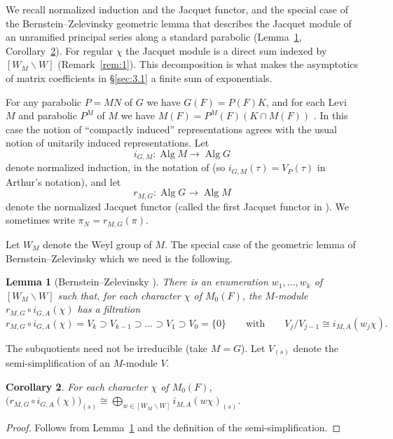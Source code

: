 \documentclass[12pt,letterpaper]{article}
\numberwithin{equation}{section}
\theoremstyle{plain}
\newtheorem{lemma}{Lemma}[section]
\newtheorem{corollary}[lemma]{Corollary}
\theoremstyle{remark}
\theoremstyle{plain}
\theoremstyle{definition}
\theoremstyle{remark}
\theoremstyle{remark}
\DeclareMathOperator{\Alg}{Alg}
\newcommand{\Wrep}[1]{[W_{#1}\backslash W]}
\begin{document}
We recall normalized induction and the Jacquet functor, and the special case of the Bernstein--Zelevinsky geometric lemma that describes the Jacquet module of an unramified principal series along a standard parabolic (Lemma~\ref{lem:2.4}, Corollary~\ref{cor:2.5}). For regular $\chi$ the Jacquet module is a direct sum indexed by $\Wrep{M}$ (Remark~\ref{rem:1}). This decomposition is what makes the asymptotics of matrix coefficients in \S\ref{sec:3.1} a finite sum of exponentials.


For any parabolic $P=MN$ of $G$ we have $G(F)=P(F)K$, and for each Levi $M$ and parabolic $P^M$ of $M$ we have $M(F)=P^M(F)(K\cap M(F))$ \cite[p.~140]{Ca79}. In this case the notion of ``compactly induced'' representations \cite[\S1.8]{BZ77} agrees with the usual notion of unitarily induced representations. Let
\begin{equation}\label{eq:2.14}
i_{G,M}:\Alg M\to\Alg G
\end{equation}
denote normalized induction, in the notation of \cite{BZ77} (so $i_{G,M}(\tau)=V_P(\tau)$ in Arthur's notation), and let
\begin{equation}\label{eq:2.15}
r_{M,G}:\Alg G\to\Alg M
\end{equation}
denote the normalized Jacquet functor \cite[\S2.3]{BZ77} (called the first Jacquet functor in \cite[\S2.2]{Ca79}). We sometimes write $\pi_N=r_{M,G}(\pi)$.

Let $W_M$ denote the Weyl group of $M$. The special case of the geometric lemma of Bernstein--Zelevinsky which we need is the following.

\begin{lemma}[Bernstein--Zelevinsky {\cite[\S2.12]{BZ77}}]\label{lem:2.4}
There is an enumeration $w_1,\dots,w_k$ of $\Wrep{M}$ such that, for each character $\chi$ of $M_0(F)$, the $M$-module $r_{M,G}\circ i_{G,A}(\chi)$ has a filtration
\[
r_{M,G}\circ i_{G,A}(\chi)=V_k\supset V_{k-1}\supset\dots\supset V_1\supset V_0=\{0\}
\qquad\text{with}\qquad V_{j}/V_{j-1}\cong i_{M,A}(w_j\chi).
\]
\end{lemma}
The subquotients need not be irreducible (take $M=G$). Let $V_{(s)}$ denote the semi-simplification of an $M$-module $V$.

\begin{corollary}\label{cor:2.5}
For each character $\chi$ of $M_0(F)$, $\big(r_{M,G}\circ i_{G,A}(\chi)\big)_{(s)}\cong\bigoplus_{w\in\Wrep{M}}i_{M,A}(w\chi)_{(s)}$.
\end{corollary}

\begin{proof}
Follows from Lemma~\ref{lem:2.4} and the definition of the semi-simplification.
\end{proof}
\end{document}
